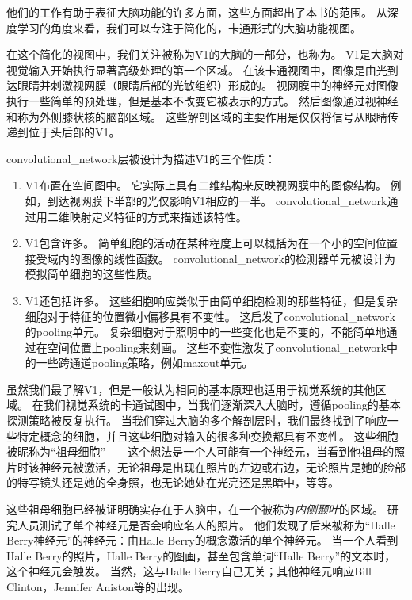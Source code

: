 他们的工作有助于表征大脑功能的许多方面，这些方面超出了本书的范围。
从深度学习的角度来看，我们可以专注于简化的，卡通形式的大脑功能视图。

在这个简化的视图中，我们关注被称为V1的大脑的一部分，也称为。
V1是大脑对视觉输入开始执行显著高级处理的第一个区域。
在该卡通视图中，图像是由光到达眼睛并刺激视网膜（眼睛后部的光敏组织）形成的。
视网膜中的神经元对图像执行一些简单的预处理，但是基本不改变它被表示的方式。
然后图像通过视神经和称为外侧膝状核的脑部区域。 
这些解剖区域的主要作用是仅仅将信号从眼睛传递到位于头后部的V1。
 
 
\gls{convolutional_network}层被设计为描述V1的三个性质：
\begin{enumerate}
  \item V1布置在空间图中。
  它实际上具有二维结构来反映视网膜中的图像结构。
  例如，到达视网膜下半部的光仅影响V1相应的一半。 
  \gls{convolutional_network}通过用二维映射定义特征的方式来描述该特性。

  \item V1包含许多。
  简单细胞的活动在某种程度上可以概括为在一个小的空间位置接受域内的图像的线性函数。
  \gls{convolutional_network}的检测器单元被设计为模拟简单细胞的这些性质。

  \item V1还包括许多。
  这些细胞响应类似于由简单细胞检测的那些特征，但是复杂细胞对于特征的位置微小偏移具有不变性。 
  这启发了\gls{convolutional_network}的\gls{pooling}单元。
  复杂细胞对于照明中的一些变化也是不变的，不能简单地通过在空间位置上\gls{pooling}来刻画。 
  这些不变性激发了\gls{convolutional_network}中的一些跨通道\gls{pooling}策略，例如maxout单元\citep{Goodfellow-et-al-ICML2013}。
\end{enumerate}

虽然我们最了解V1，但是一般认为相同的基本原理也适用于视觉系统的其他区域。
在我们视觉系统的卡通试图中，当我们逐渐深入大脑时，遵循\gls{pooling}的基本探测策略被反复执行。
当我们穿过大脑的多个解剖层时，我们最终找到了响应一些特定概念的细胞，并且这些细胞对输入的很多种变换都具有不变性。
这些细胞被昵称为``祖母细胞''——这个想法是一个人可能有一个神经元，当看到他祖母的照片时该神经元被激活，无论祖母是出现在照片的左边或右边，无论照片是她的脸部的特写镜头还是她的全身照，也无论她处在光亮还是黑暗中，等等。

这些祖母细胞已经被证明确实存在于人脑中，在一个被称为\emph{内侧颞叶}的区域\citep{quiroga2005invariant}。
研究人员测试了单个神经元是否会响应名人的照片。
他们发现了后来被称为``Halle Berry神经元''的神经元：由Halle Berry的概念激活的单个神经元。
当一个人看到Halle Berry的照片，Halle Berry的图画，甚至包含单词``Halle Berry''的文本时，这个神经元会触发。
当然，这与Halle Berry自己无关；其他神经元响应Bill Clinton，Jennifer Aniston等的出现。
 
